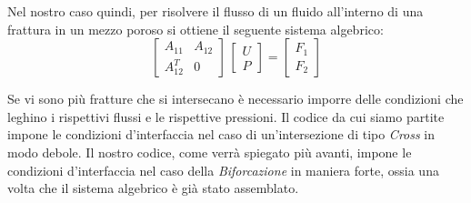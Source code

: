Nel nostro caso quindi, per risolvere il flusso di un fluido all'interno di una frattura in un mezzo poroso si ottiene il seguente sistema algebrico:
\begin{equation}
\left[\begin{matrix}A_{11} &A_{12} \\A_{12}^T & 0 \end{matrix}\right] \, \left[\begin{matrix}U  \\P \end{matrix}\right] = \left[\begin{matrix}F_{1} \\F_{2} \end{matrix}\right] 
\end{equation}
\label{sistemaAlgebrico}

Se vi sono più fratture che si intersecano è necessario imporre delle condizioni che leghino i rispettivi flussi e le rispettive pressioni. Il codice da cui siamo partite impone le condizioni d'interfaccia nel caso di un'intersezione di tipo \textit{Cross} in modo debole. Il nostro codice, come verrà spiegato più avanti, impone le condizioni d'interfaccia nel caso della \textit{Biforcazione} in maniera forte, ossia una volta che il sistema algebrico è già stato assemblato.